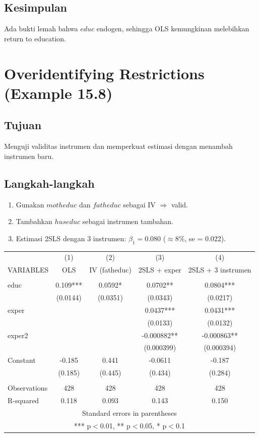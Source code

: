 \documentclass[]{article}
\begin{document}
\subsection*{Kesimpulan}
Ada bukti lemah bahwa $educ$ endogen, sehingga OLS kemungkinan melebihkan return to education.

\section{Overidentifying Restrictions (Example 15.8)}
\subsection*{Tujuan}
Menguji validitas instrumen dan memperkuat estimasi dengan menambah instrumen baru.

\subsection*{Langkah-langkah}
\begin{enumerate}
    \item Gunakan $motheduc$ dan $fatheduc$ sebagai IV $\Rightarrow$ valid.
    \item Tambahkan $huseduc$ sebagai instrumen tambahan.
    \item Estimasi 2SLS dengan 3 instrumen: $\beta_1 = 0.080$ ($\approx 8\%$, se = 0.022).
\end{enumerate}
 
\begin{tabular}{lcccc} \hline
 & (1) & (2) & (3) & (4) \\
VARIABLES & OLS & IV (fatheduc) & 2SLS + exper & 2SLS + 3 instrumen \\ \hline
 &  &  &  &  \\
educ & 0.109*** & 0.0592* & 0.0702** & 0.0804*** \\
 & (0.0144) & (0.0351) & (0.0343) & (0.0217) \\
exper &  &  & 0.0437*** & 0.0431*** \\
 &  &  & (0.0133) & (0.0132) \\
exper2 &  &  & -0.000882** & -0.000863** \\
 &  &  & (0.000399) & (0.000394) \\
Constant & -0.185 & 0.441 & -0.0611 & -0.187 \\
 & (0.185) & (0.445) & (0.434) & (0.284) \\
 &  &  &  &  \\
Observations & 428 & 428 & 428 & 428 \\
 R-squared & 0.118 & 0.093 & 0.143 & 0.150 \\ \hline
\multicolumn{5}{c}{ Standard errors in parentheses} \\
\multicolumn{5}{c}{ *** p$<$0.01, ** p$<$0.05, * p$<$0.1} \\
\end{tabular}
 
\end{document}
